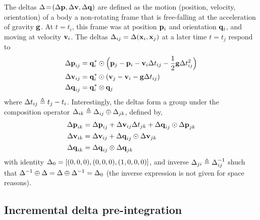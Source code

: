 The deltas $\Delta\!=\!({\Delta{\bf p}},{\Delta{\bf v}},{\Delta{\bf q}})$ are defined as the motion (position, velocity, orientation) of a body \wrt a non-rotating frame that is free-falling at the acceleration of gravity ${\bf g}$. At $t=t_i$, this frame was at position ${\bf p}_i$ and orientation ${\bf q}_i$, and moving at velocity ${\bf v}_i$. The deltas $\Delta_{ij}=\Delta({\bf x}_i,{\bf x}_j)$ at a later time $t=t_j$ respond to%
%
\begin{align}\label{equ:delta_definition}
\begin{split}
{\Delta{\bf p}}_{ij} &= {\bf q}_i^*\odot\Big({\bf p}_j - {\bf p}_i - {\bf v}_i\Delta t_{ij} - \frac12{\bf g}\Delta t_{ij}^2\Big) \\
{\Delta{\bf v}}_{ij} &= {\bf q}_i^*\odot({\bf v}_j - {\bf v}_i - {\bf g}\Delta t_{ij}) \\
{\Delta{\bf q}}_{ij} &= {\bf q}_i^*\otimes{\bf q}_j 
\end{split}
\end{align}
%
where $\Delta t_{ij} \triangleq t_j - t_i$. Interestingly, the deltas form a group under the composition operator $\Delta_{ik}\triangleq\Delta_{ij}\oplus\Delta_{jk}$, defined by,
%
\begin{align} \label{equ:g_composition}
\begin{split}
{\Delta{\bf p}}_{ik} 
&= {\Delta{\bf p}}_{ij} + {\Delta{\bf v}}_{ij}\Delta t_{jk} + {\Delta{\bf q}}_{ij}\odot{\Delta{\bf p}}_{jk} \\
{\Delta{\bf v}}_{ik} 
&= {\Delta{\bf v}}_{ij} + {\Delta{\bf q}}_{ij}\odot{\Delta{\bf v}}_{jk} \\
{\Delta{\bf q}}_{ik} 
&= {\Delta{\bf q}}_{ij}\otimes{\Delta{\bf q}}_{jk} 
\end{split}
\end{align}
%
with identity $\Delta_0=[(0,0,0),(0,0,0),(1,0,0,0)]$, and inverse $\Delta_{ji}\triangleq\Delta_{ij}^{-1}$ shuch that $\Delta^{-1}\oplus\Delta=\Delta\oplus\Delta^{-1}=\Delta_0$ (the inverse expression is not given for space reasons).%
%



\subsection{Incremental delta pre-integration}

